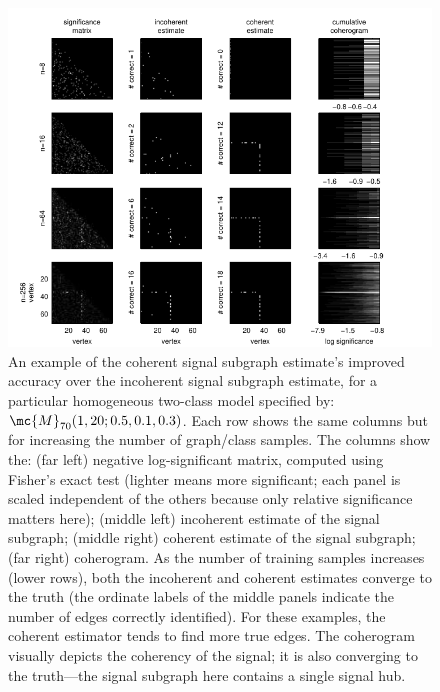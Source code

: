 \documentclass[10pt,journal,cspaper,compsoc]{IEEEtran}
\begin{document}
\begin{figure}[tb!]
	\centering
		\includegraphics[width=1.0\linewidth]{../figs/homo_V70_s20_p10_q30_SigIncCohErogram.pdf}
	\caption{An example of the coherent signal subgraph estimate's improved accuracy over the incoherent signal subgraph estimate, for a particular homogeneous two-class model specified by: $\mc{M}_{70}(1,20;0.5,0.1,0.3)$. Each row shows the same columns but for increasing the number of graph/class samples.  The columns show the: (far left) negative log-significant matrix, computed using Fisher's exact test (lighter means more significant; each panel is scaled independent of the others because only relative significance matters here); (middle left) incoherent estimate of the signal subgraph; (middle right) coherent estimate of the signal subgraph; (far right) coherogram.  As the number of training samples increases (lower rows), both the incoherent and coherent estimates converge to the truth (the ordinate labels of the middle panels indicate the number of edges correctly identified).  For these examples, the coherent estimator tends to find more true edges.  The coherogram visually depicts the coherency of the signal; it is also converging to the truth---the signal subgraph here contains a single signal hub.}
	\label{fig:4x4}
\end{figure}
\end{document}
